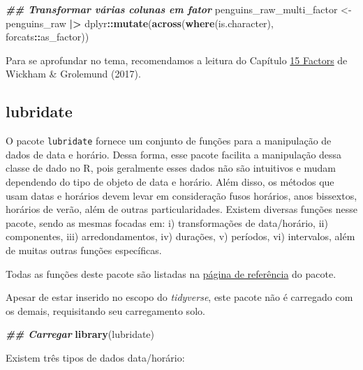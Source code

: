 \documentclass[
]{article}
\newenvironment{Shaded}{\begin{snugshade}}{\end{snugshade}}
\newcommand{\DocumentationTok}[1]{\textcolor[rgb]{0.56,0.35,0.01}{\textbf{\textit{#1}}}}
\newcommand{\FunctionTok}[1]{\textcolor[rgb]{0.13,0.29,0.53}{\textbf{#1}}}
\newcommand{\NormalTok}[1]{#1}
\newcommand{\OtherTok}[1]{\textcolor[rgb]{0.56,0.35,0.01}{#1}}
\newcommand{\SpecialCharTok}[1]{\textcolor[rgb]{0.81,0.36,0.00}{\textbf{#1}}}
\begin{document}
\begin{Shaded}
\begin{Highlighting}[]
\DocumentationTok{\#\# Transformar várias colunas em fator}
\NormalTok{penguins\_raw\_multi\_factor }\OtherTok{\textless{}{-}}\NormalTok{ penguins\_raw }\SpecialCharTok{|\textgreater{}} 
\NormalTok{    dplyr}\SpecialCharTok{::}\FunctionTok{mutate}\NormalTok{(}\FunctionTok{across}\NormalTok{(}\FunctionTok{where}\NormalTok{(is.character), forcats}\SpecialCharTok{::}\NormalTok{as\_factor))}
\end{Highlighting}
\end{Shaded}

Para se aprofundar no tema, recomendamos a leitura do Capítulo \href{https://r4ds.had.co.nz/factors.html}{15 Factors} de Wickham \& Grolemund (2017).

\hypertarget{lubridate}{%
\subsection{lubridate}\label{lubridate}}

O pacote \texttt{lubridate} fornece um conjunto de funções para a manipulação de dados de data e horário. Dessa forma, esse pacote facilita a manipulação dessa classe de dado no R, pois geralmente esses dados não são intuitivos e mudam dependendo do tipo de objeto de data e horário. Além disso, os métodos que usam datas e horários devem levar em consideração fusos horários, anos bissextos, horários de verão, além de outras particularidades. Existem diversas funções nesse pacote, sendo as mesmas focadas em: i) transformações de data/horário, ii) componentes, iii) arredondamentos, iv) durações, v) períodos, vi) intervalos, além de muitas outras funções específicas.

Todas as funções deste pacote são listadas na \href{https://lubridate.tidyverse.org/reference/index.html}{página de referência} do pacote.

Apesar de estar inserido no escopo do \emph{tidyverse}, este pacote não é carregado com os demais, requisitando seu carregamento solo.

\begin{Shaded}
\begin{Highlighting}[]
\DocumentationTok{\#\# Carregar}
\FunctionTok{library}\NormalTok{(lubridate)}
\end{Highlighting}
\end{Shaded}

Existem três tipos de dados data/horário:
\end{document}
